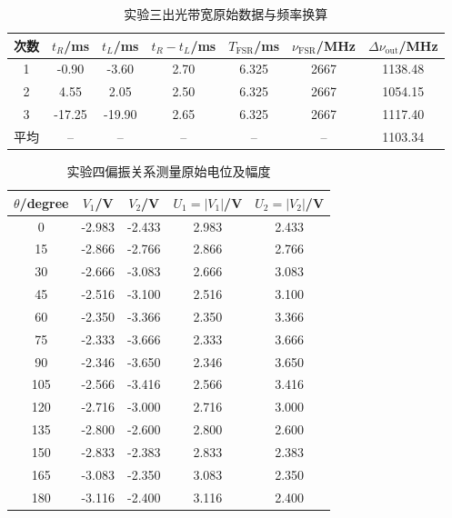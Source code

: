 \documentclass[UTF8,a4paper,10pt]{ctexart}
\begin{document}
\begin{table}[H]
  \centering
  \caption{实验三出光带宽原始数据与频率换算}
  \label{tab:bandwidth-raw}
  \setlength{\tabcolsep}{5pt}
  \begin{tabular}{c c c c c c c}
    \toprule
    次数 & $t_R$/ms & $t_L$/ms & $t_R-t_L$/ms & $T_{\mathrm{FSR}}$/ms & $\nu_{\mathrm{FSR}}$/MHz & $\Delta\nu_{\mathrm{out}}$/MHz \\
    \midrule
    1 & -0.90 & -3.60 & 2.70 & 6.325 & 2667 & 1138.48 \\
    2 & 4.55 & 2.05 & 2.50 & 6.325 & 2667 & 1054.15 \\
    3 & -17.25 & -19.90 & 2.65 & 6.325 & 2667 & 1117.40 \\
    平均 & -- & -- & -- & -- & -- & 1103.34 \\
    \bottomrule
  \end{tabular}
\end{table}

\begin{table}[H]
  \centering
  \caption{实验四偏振关系测量原始电位及幅度}
  \label{tab:polarization-raw}
  \setlength{\tabcolsep}{8pt}
  \begin{tabular}{ccccc}
    \toprule
    $\theta$/degree & $V_1$/V & $V_2$/V & $U_1=|V_1|$/V & $U_2=|V_2|$/V \\
    \midrule
    0   & -2.983 & -2.433 & 2.983 & 2.433 \\
    15  & -2.866 & -2.766 & 2.866 & 2.766 \\
    30  & -2.666 & -3.083 & 2.666 & 3.083 \\
    45  & -2.516 & -3.100 & 2.516 & 3.100 \\
    60  & -2.350 & -3.366 & 2.350 & 3.366 \\
    75  & -2.333 & -3.666 & 2.333 & 3.666 \\
    90  & -2.346 & -3.650 & 2.346 & 3.650 \\
    105 & -2.566 & -3.416 & 2.566 & 3.416 \\
    120 & -2.716 & -3.000 & 2.716 & 3.000 \\
    135 & -2.800 & -2.600 & 2.800 & 2.600 \\
    150 & -2.833 & -2.383 & 2.833 & 2.383 \\
    165 & -3.083 & -2.350 & 3.083 & 2.350 \\
    180 & -3.116 & -2.400 & 3.116 & 2.400 \\
    \bottomrule
  \end{tabular}
\end{table}
\end{document}
